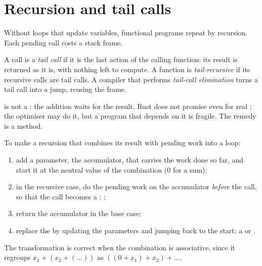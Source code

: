 \section{Recursion and tail calls}\label{sec:b2:functional-programming:tail}

Without loops that update variables, functional programs repeat by recursion. Each pending call costs a stack frame.

\begin{definition}\label{def:b2:functional-programming:tail}
A call is a \emph{tail call} if it is the last action of the calling function: its result is
returned as it is, with nothing left to compute. A function is \emph{tail-recursive} if its
recursive calls are tail calls. A compiler that performs \emph{tail-call elimination} turns a tail call into a jump,
reusing the frame.
\end{definition}

\label{lst:b2:functional-programming:deep}

\label{out:b2:functional-programming:deep}

 is not a : the addition waits for the result. Rust does not promise  even for real ; the optimiser may do it, but a program that depends on it is fragile. The
remedy is a method.

\begin{method}\label{met:b2:functional-programming:accumulator}
To make a recursion that combines its result with pending work into a loop:
\begin{enumerate}
\item add a parameter, the accumulator, that carries the work done so far, and start it at the neutral value of the
combination (0 for a sum);
\item in the recursive case, do the pending work on the accumulator \emph{before} the call, so that the call becomes a
: ;
\item return the accumulator in the base case;
\item replace the  by updating the parameters and jumping back to the start: a  or
.
\end{enumerate}
The transformation is correct when the combination is associative, since it regroups $x_1 + (x_2 + (\dots))$ as
$((0 + x_1) + x_2) + \dots$.
\end{method}

